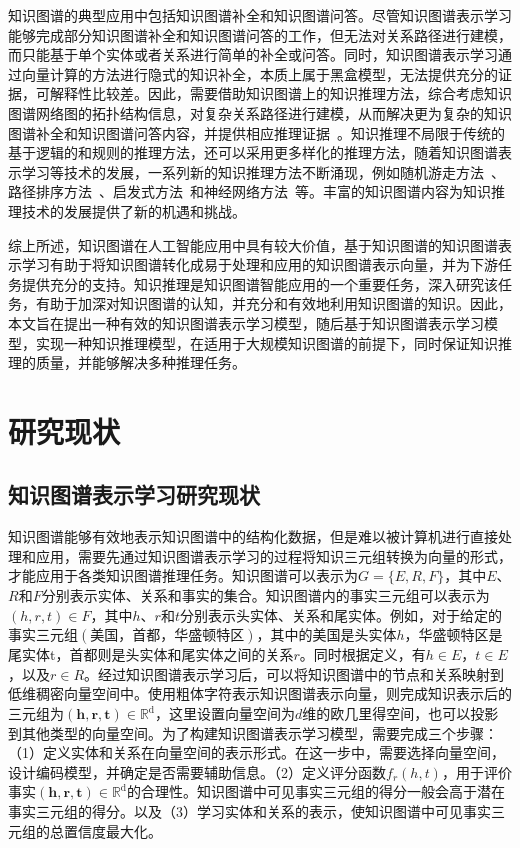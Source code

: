 \documentclass[algorithmlist, AutoFakeBold, AutoFakeSlant, figurelist, tablelist, nomlist, masters]{seuthesix}
\begin{document}
知识图谱的典型应用中包括知识图谱补全和知识图谱问答。尽管知识图谱表示学习能够完成部分知识图谱补全和知识图谱问答的工作，但无法对关系路径进行建模，而只能基于单个实体或者关系进行简单的补全或问答。同时，知识图谱表示学习通过向量计算的方法进行隐式的知识补全，本质上属于黑盒模型，无法提供充分的证据，可解释性比较差。因此，需要借助知识图谱上的知识推理方法，综合考虑知识图谱网络图的拓扑结构信息，对复杂关系路径进行建模，从而解决更为复杂的知识图谱补全和知识图谱问答内容，并提供相应推理证据~\cite{chen2020review}。知识推理不局限于传统的基于逻辑的和规则的推理方法，还可以采用更多样化的推理方法，随着知识图谱表示学习等技术的发展，一系列新的知识推理方法不断涌现，例如随机游走方法~\cite{jagvaral2020path}、路径排序方法~\cite{zhao2021target}、启发式方法~\cite{he2021heuristic}和神经网络方法~\cite{wang2018deep}等。丰富的知识图谱内容为知识推理技术的发展提供了新的机遇和挑战。

综上所述，知识图谱在人工智能应用中具有较大价值，基于知识图谱的知识图谱表示学习有助于将知识图谱转化成易于处理和应用的知识图谱表示向量，并为下游任务提供充分的支持。知识推理是知识图谱智能应用的一个重要任务，深入研究该任务，有助于加深对知识图谱的认知，并充分和有效地利用知识图谱的知识。因此，本文旨在提出一种有效的知识图谱表示学习模型，随后基于知识图谱表示学习模型，实现一种知识推理模型，在适用于大规模知识图谱的前提下，同时保证知识推理的质量，并能够解决多种推理任务。

\section{研究现状}
\subsection{知识图谱表示学习研究现状}
知识图谱能够有效地表示知识图谱中的结构化数据，但是难以被计算机进行直接处理和应用，需要先通过知识图谱表示学习的过程将知识三元组转换为向量的形式，才能应用于各类知识图谱推理任务。知识图谱可以表示为$G=\{E, R, F\}$，其中$E$、$R$和$F$分别表示实体、关系和事实的集合。知识图谱内的事实三元组可以表示为$(h, r, t) \in F$，其中$h$、$r$和$t$分别表示头实体、关系和尾实体。例如，对于给定的事实三元组$\left(\mbox{美国，首都，华盛顿特区}\right)$，其中的$\mbox{美国}$是头实体$h$，$\mbox{华盛顿特区}$是尾实体t，$\mbox{首都}$则是头实体和尾实体之间的关系$r$。同时根据定义，有$h \in E$，$t \in E$，以及$r \in R$。经过知识图谱表示学习后，可以将知识图谱中的节点和关系映射到低维稠密向量空间中。使用粗体字符表示知识图谱表示向量，则完成知识表示后的三元组为$\left(\bm{h}, \bm{r}, \bm{t}\right) \in \mathbb{R}^{\mathrm{d}}$，这里设置向量空间为$d$维的欧几里得空间，也可以投影到其他类型的向量空间。为了构建知识图谱表示学习模型，需要完成三个步骤：（1）定义实体和关系在向量空间的表示形式。在这一步中，需要选择向量空间，设计编码模型，并确定是否需要辅助信息。（2）定义评分函数$f_r(h, t)$，用于评价事实$\left(\bm{h}, \bm{r}, \bm{t}\right) \in \mathbb{R}^{\mathrm{d}}$的合理性。知识图谱中可见事实三元组的得分一般会高于潜在事实三元组的得分。以及（3）学习实体和关系的表示，使知识图谱中可见事实三元组的总置信度最大化。
\end{document}
